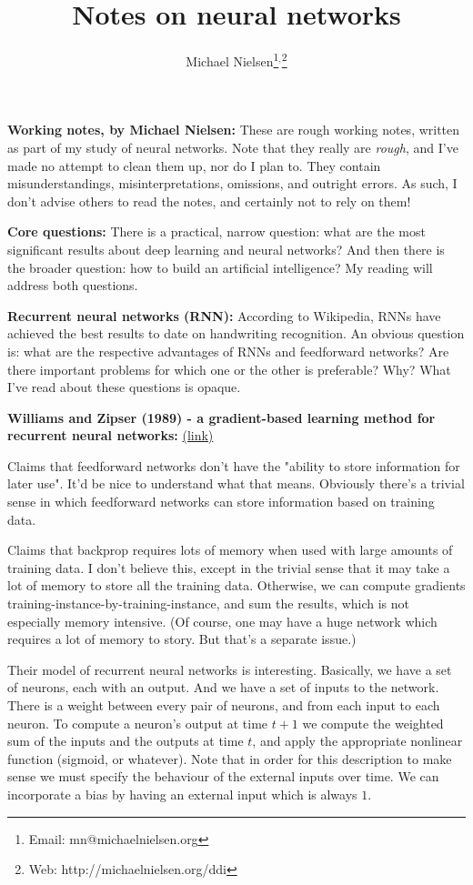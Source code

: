 \documentclass[12pt]{article}
\newcommand{\link}[2]{\href{#1}{#2}}
\begin{document}
\title{Notes on neural networks}
\author{Michael Nielsen\thanks{Email: mn@michaelnielsen.org}$^{,}$\thanks{Web: http://michaelnielsen.org/ddi}}

\maketitle

\textbf{Working notes, by Michael Nielsen:} These are rough working
notes, written as part of my study of neural networks.  Note that they
really are \emph{rough}, and I've made no attempt to clean them up,
nor do I plan to.  They contain misunderstandings, misinterpretations,
omissions, and outright errors.  As such, I don't advise others to
read the notes, and certainly not to rely on them!

\textbf{Core questions:} There is a practical, narrow question: what
are the most significant results about deep learning and neural
networks?  And then there is the broader question: how to build an
artificial intelligence?  My reading will address both questions.

\textbf{Recurrent neural networks (RNN):} According to Wikipedia, RNNs
have achieved the best results to date on handwriting recognition.  An
obvious question is: what are the respective advantages of RNNs and
feedforward networks?  Are there important problems for which one or
the other is preferable?  Why?  What I've read about these questions
is opaque.

\textbf{Williams and Zipser (1989) - a gradient-based learning method
  for recurrent neural networks:}
\link{http://scholar.google.ca/scholar?cluster=1352799553544912946\&hl=en\&as\_sdt=0,5}{(link)}
  
Claims that feedforward networks don't have the "ability to store
information for later use".  It'd be nice to understand what that
means.  Obviously there's a trivial sense in which feedforward
networks can store information based on training data.  

Claims that backprop requires lots of memory when used with large
amounts of training data.  I don't believe this, except in the trivial
sense that it may take a lot of memory to store all the training data.
Otherwise, we can compute gradients
training-instance-by-training-instance, and sum the results, which is
not especially memory intensive.  (Of course, one may have a huge
network which requires a lot of memory to story.  But that's a
separate issue.)

Their model of recurrent neural networks is interesting.  Basically,
we have a set of neurons, each with an output.  And we have a set of
inputs to the network.  There is a weight between every pair of
neurons, and from each input to each neuron.  To compute a neuron's
output at time $t+1$ we compute the weighted sum of the inputs and the
outputs at time $t$, and apply the appropriate nonlinear function
(sigmoid, or whatever).  Note that in order for this description to
make sense we must specify the behaviour of the external inputs over
time.  We can incorporate a bias by having an external input which is
always $1$.
  
\end{document}
